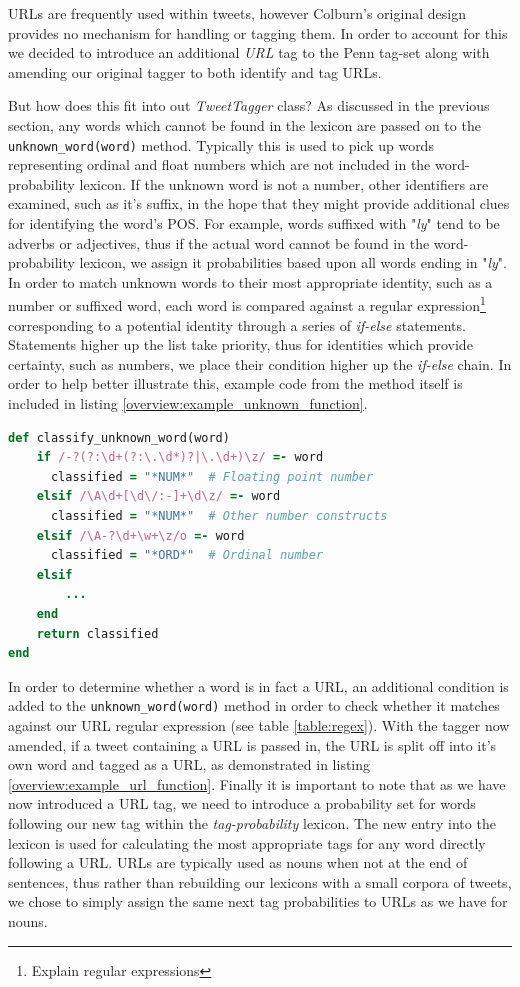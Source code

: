 URLs are frequently used within tweets, however Colburn's original design provides no mechanism for handling or tagging them. In order to account for this we decided to introduce an additional \emph{URL} tag to the Penn tag-set along with amending our original tagger to both identify and tag URLs.

But how does this fit into out \emph{TweetTagger} class? As discussed in the previous section, any words which cannot be found in the lexicon are passed on to the \texttt{unknown\-\_word\-(word)} method. Typically this is used to pick up words representing ordinal and float numbers which are not included in the word-probability lexicon. If the unknown word is not a number, other identifiers are examined, such as it's suffix, in the hope that they might provide additional clues for identifying the word's POS. For example, words suffixed with "\emph{ly}" tend to be adverbs or adjectives, thus if the actual word cannot be found in the word-probability lexicon, we assign it probabilities based upon all words ending in "\emph{ly}". In order to match unknown words to their most appropriate identity, such as a number or suffixed word, each word is compared against a regular expression\footnote{Explain regular expressions} corresponding to a potential identity through a series of \emph{if-else} statements. Statements higher up the list take priority, thus for identities which provide certainty, such as numbers, we place their condition higher up the \emph{if-else} chain. In order to help better illustrate this, example code from the method itself is included in listing \ref{overview:example_unknown_function}.

\begin{lstlisting}[language=Ruby, caption={Example if-else statements for handling unknown words}, label=overview:example_unknown_function]
def classify_unknown_word(word)
	if /-?(?:\d+(?:\.\d*)?|\.\d+)\z/ =- word 
	  classified = "*NUM*"	# Floating point number
	elsif /\A\d+[\d\/:-]+\d\z/ =- word  
	  classified = "*NUM*"	# Other number constructs
	elsif /\A-?\d+\w+\z/o =- word
	  classified = "*ORD*"	# Ordinal number
	elsif
		...
	end
	return classified
end
\end{lstlisting}

In order to determine whether a word is in fact a URL, an additional condition is added to the \texttt{unknown\_word(word)} method in order to  check whether it matches against our URL regular expression (see table \ref{table:regex}). With the tagger now amended, if a tweet containing a URL is passed in, the URL is split off into it's own word and tagged as a URL, as demonstrated in listing \ref{overview:example_url_function}. Finally it is important to note that as we have now introduced a URL tag, we need to introduce a probability set for words following our new tag within the \emph{tag-probability} lexicon. The new entry into the lexicon is used for calculating the most appropriate tags for any word directly following a URL. URLs are typically used as nouns when not at the end of sentences, thus rather than rebuilding our lexicons with a small corpora of tweets, we chose to simply assign the same next tag probabilities to URLs as we have for nouns.

